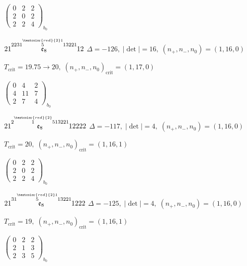 \documentclass[10pt]{article}
\begin{document}
\hspace{2em}$\left(\begin{smallmatrix}0 & 2 & 2 \\ 2 & 0 & 2 \\ 2 & 2 & 4\end{smallmatrix}\right)_{\!b_0}$

\smallskip

$21\overset{2231\overset{\textcolor{red}{2}1}{5}13221}{\mathfrak{e}_8}12$ \quad $\Delta=-126,\; |\det|=16,\; (n_+,n_-,n_0)=(1,16,0)$

\hspace{1em}$T_{\text{crit}}=19.75 \to 20,\; (n_+,n_-,n_0)_{\text{crit}}=(1,17,0)$

\hspace{2em}$\left(\begin{smallmatrix}0 & 4 & 2 \\ 4 & 11 & 7 \\ 2 & 7 & 4\end{smallmatrix}\right)_{\!b_0}$

\smallskip

$21\overset{2\overset{\textcolor{red}{2}}{1}513221}{\mathfrak{e}_8}12222$ \quad $\Delta=-117,\; |\det|=4,\; (n_+,n_-,n_0)=(1,16,0)$

\hspace{1em}$T_{\text{crit}}=20,\; (n_+,n_-,n_0)_{\text{crit}}=(1,16,1)$

\hspace{2em}$\left(\begin{smallmatrix}0 & 2 & 2 \\ 2 & 0 & 2 \\ 2 & 2 & 4\end{smallmatrix}\right)_{\!b_0}$

\smallskip

$21\overset{31\overset{\textcolor{red}{2}1}{5}13221}{\mathfrak{e}_8}1222$ \quad $\Delta=-125,\; |\det|=4,\; (n_+,n_-,n_0)=(1,16,0)$

\hspace{1em}$T_{\text{crit}}=19,\; (n_+,n_-,n_0)_{\text{crit}}=(1,16,1)$

\hspace{2em}$\left(\begin{smallmatrix}0 & 2 & 2 \\ 2 & 1 & 3 \\ 2 & 3 & 5\end{smallmatrix}\right)_{\!b_0}$
\end{document}
